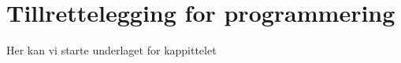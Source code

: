 \chapter{Tillrettelegging for programmering}
\thispagestyle{fancy}
Her kan vi starte underlaget for kappittelet
